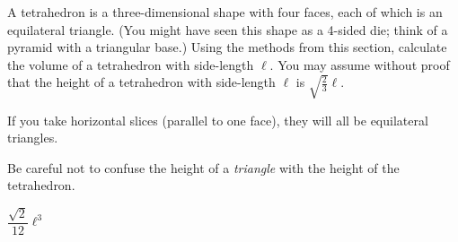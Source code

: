 \begin{question}
A tetrahedron is a three-dimensional shape with four faces, each of which is an equilateral triangle. (You might have seen this shape as a 4-sided die; think of a pyramid with a triangular base.) Using the methods from this section, calculate the volume of a tetrahedron with side-length $\ell$. You may assume without proof that the height of a tetrahedron with side-length $\ell$ is $\sqrt{\frac{2}{3}}\ell$.

\begin{center}
\end{center}
\end{question}
\begin{hint}
If you take horizontal slices (parallel to one face), they will all be equilateral triangles.

Be careful not to confuse the height of a \emph{triangle} with the height of the tetrahedron.
\end{hint}
\begin{answer}
$\dfrac{\sqrt{2}}{12}\ell^3$
\end{answer}
